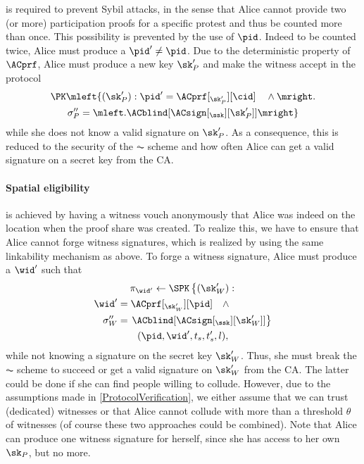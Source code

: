  is required to prevent Sybil attacks, in the sense
that Alice cannot provide two (or more) participation proofs for a
specific protest and thus be counted more than once.
This possibility is prevented by the use of \(\pid\).
Indeed to be counted twice, Alice must produce a \(\pid'\neq \pid\).
Due to the deterministic property of \(\ACprf\), Alice must produce a new key \(\sk_P'\) and make the witness accept in the protocol
\begin{multline*}
\PK\mleft\{ (\sk_P') : \pid' = \ACprf[_{\sk_P'}][\cid] \quad \land \mright. \\
    \sigma_P'' = \mleft. \ACblind[\ACsign[_{\ssk}][\sk_P']] \mright\}
\end{multline*}
while she does not know a valid signature on \(\sk_P'\).
As a consequence, this is reduced to the security of the \(\AC\) scheme and how often Alice can get a valid signature on a secret key from the \ac{CA}.

\paragraph{Spatial eligibility}%
\label{analysis-spatial}

 is achieved by having a witness vouch anonymously that Alice was indeed on the location when the proof share was created.
To realize this, we have to ensure that Alice cannot forge witness signatures, which is realized by using the same linkability mechanism as above.
To forge a witness signature, Alice must produce a \(\wid'\) such that
\begin{multline*}
  \pi_{\wid'}\gets \SPK\left\{ (\sk_W') : \right. \\
    \begin{aligned}
      \wid' &= \ACprf[_{\sk_W'}][\pid] \quad \land \\
      \sigma_W'' &= \left. \ACblind[\ACsign[_{\ssk}][\sk_W']] \right\}
    \end{aligned} \\
      (\pid, \wid', t_s, t_s', l),
\end{multline*}
while not knowing a signature on the secret key \(\sk_W'\).
Thus, she must break the \(\AC\) scheme to succeed or get a valid signature on \(\sk_W'\) from the \ac{CA}.
The latter could be done if she can find people willing to collude.
However, due to the assumptions made in \cref{ProtocolVerification}, we either assume that we can trust (dedicated) witnesses or that Alice cannot collude with more than a threshold \(\theta\) of witnesses (of course these two approaches could be combined).
Note that Alice can produce one witness signature for herself, since she has access to her own \(\sk_P\), but no more.

